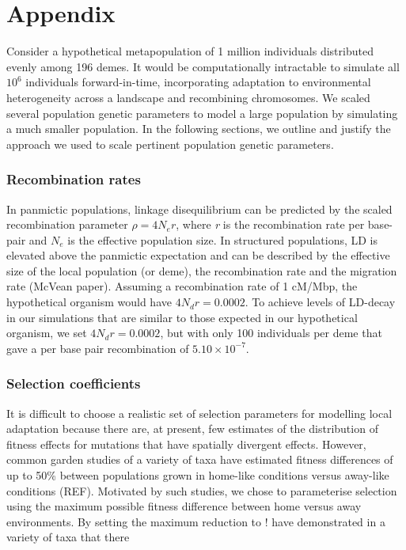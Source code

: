 \documentclass[11pt,twoside,lineno]{GSA_format}
\newcommand{\beginsupplement}{%
        \setcounter{table}{0}
        \renewcommand{\thetable}{S\arabic{table}}%
        \setcounter{figure}{0}
        \renewcommand{\thefigure}{S\arabic{figure}}%
     }
\begin{document}
%
\beginsupplement

\section{Appendix}


Consider a hypothetical metapopulation of 1 million individuals distributed evenly among 196 demes. It would be computationally intractable to simulate all $10^6$ individuals forward-in-time, incorporating adaptation to environmental heterogeneity across a landscape and recombining chromosomes. We scaled several population genetic parameters to model a large population by simulating a much smaller population. In the following sections, we outline and justify the approach we used to scale pertinent population genetic parameters. 

\subsubsection{Recombination rates}

In panmictic populations, linkage disequilibrium can be predicted by the scaled recombination parameter $\rho = 4N_er$, where \textit{r} is the recombination rate per base-pair and $N_e$ is the effective population size. In structured populations, LD is elevated above the panmictic expectation and can be described by the effective size of the local population (or deme), the recombination rate and the migration rate (McVean paper). Assuming a recombination rate of 1 cM/Mbp, the hypothetical organism would have $4N_dr = 0.0002$. To achieve levels of LD-decay in our simulations that are similar to those expected in our hypothetical organism, we set $4N_dr = 0.0002$, but with only 100 individuals per deme that gave a per base pair recombination of $5.10 \times 10^{-7}$.

\subsubsection{Selection coefficients} 

It is difficult to choose a realistic set of selection parameters for modelling local adaptation because there are, at present, few estimates of the distribution of fitness effects for mutations that have spatially divergent effects. However, common garden studies of a variety of taxa have estimated fitness differences of up to 50\% between populations grown in home-like conditions versus away-like conditions (REF). Motivated by such studies, we chose to parameterise selection using the maximum possible fitness difference between home versus away environments. By setting the maximum reduction to $!$
have demonstrated in a variety of taxa that there 
\end{document}
